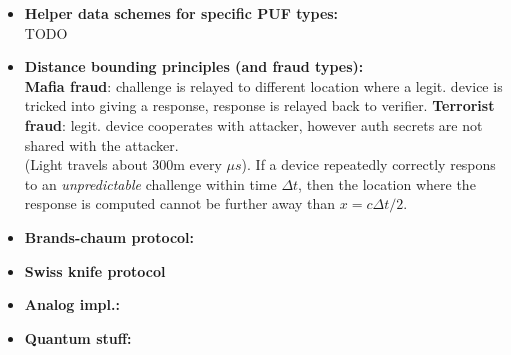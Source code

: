 \documentclass[twocolumn,9pt]{extarticle}
\begin{document}
\begin{itemize}
	\item \textbf{Helper data schemes for specific PUF types: } \\
	TODO

	\item \textbf{Distance bounding principles (and fraud types): } \\
	\textbf{Mafia fraud}: challenge is relayed to different location where a legit. device is tricked into giving a response, response is relayed back to verifier.
	\textbf{Terrorist fraud}: legit. device cooperates with attacker, however auth secrets are not shared with the attacker.\\
	(Light travels about 300m every $\mu s$). If a device repeatedly correctly respons to an \emph{unpredictable} challenge within time $\Delta t$, then the location where the response is computed cannot be further away than $x = c \Delta t/2$.
	\item \textbf{Brands-chaum protocol: } \\

	\item \textbf{Swiss knife protocol } \\

	\item \textbf{Analog impl.: } \\

	\item \textbf{Quantum stuff: } \\


\end{itemize}
\end{document}
